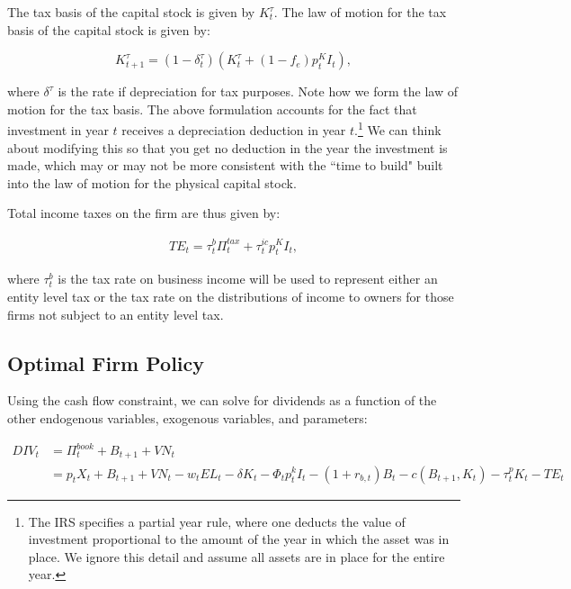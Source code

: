The tax basis of the capital stock is given by $K^{\tau}_{t}$.  The law of motion for the tax basis of the capital stock is given by:

\begin{equation}
\label{eqn:lom_taxcapital}
K^{\tau}_{t+1}=(1-\delta^{\tau}_{t})(K^{\tau}_{t} + (1-f_{e})p^{K}_{t}I_{t}),
\end{equation}

\noindent\noindent where $\delta^{\tau}$ is the rate if depreciation for tax purposes.  Note how we form the law of motion for the tax basis.  The above formulation accounts for the fact that investment in year $t$ receives a depreciation deduction in year $t$.\footnote{The IRS specifies a partial year rule, where one deducts the value of investment proportional to the amount of the year in which the asset was in place.  We ignore this detail and assume all assets are in place for the entire year.}  We can think about modifying this so that you get no deduction in the year the investment is made, which may or may not be more consistent with the ``time to build" built into the law of motion for the physical capital stock.


Total income taxes on the firm are thus given by:

\begin{equation}
\label{eqn:corp_tax}
\begin{split}
TE_{t}= \tau^{b}_{t}\Pi^{tax}_{t} +\tau^{ic}_{t}p^{K}_{t}I_{t},
\end{split}
\end{equation}

\noindent\noindent  where $\tau^{b}_{t}$ is the tax rate on business income will be used to represent either an entity level tax or the tax rate on the distributions of income to owners for those firms not subject to an entity level tax.  

\subsection{Optimal Firm Policy}

Using the cash flow constraint, we can solve for dividends as a function of the other endogenous variables, exogenous variables, and parameters:

\begin{equation}
\label{eqn:div}
\begin{split}
DIV_{t}&=\Pi^{book}_{t} + B_{t+1} + VN_{t}\\
 & = p_{t}X_{t}+ B_{t+1} + VN_{t}-w_{t}EL_{t}-\delta K_{t} -\Phi_{t}p^{k}_{t}I_{t}-(1+r_{b,t})B_{t} - c(B_{t+1},K_{t})-\tau^{p}_{t}K_{t}-TE_{t}
\end{split}
\end{equation}

